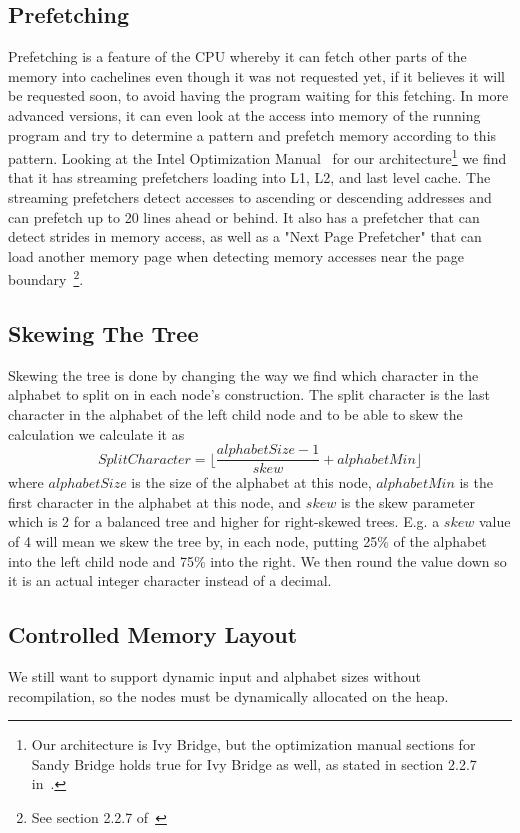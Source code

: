 \subsection{Prefetching}
Prefetching is a feature of the CPU whereby it can fetch other parts of the memory into cachelines even though it was not requested yet, if it believes it will be requested soon, to avoid having the program waiting for this fetching.
In more advanced versions, it can even look at the access into memory of the running program and try to determine a pattern and prefetch memory according to this pattern.
Looking at the Intel Optimization Manual~\cite{intel-optimization-manual} for our architecture\footnote{Our architecture is Ivy Bridge, but the optimization manual sections for Sandy Bridge holds true for Ivy Bridge as well, as stated in section 2.2.7 in~\cite{intel-optimization-manual}.} we find that it has streaming prefetchers loading into L1, L2, and last level cache. The streaming prefetchers detect accesses to ascending or descending addresses and can prefetch up to 20 lines ahead or behind. It also has a prefetcher that can detect strides in memory access, as well as a "Next Page Prefetcher" that can load another memory page when detecting memory accesses near the page boundary~\footnote{See section 2.2.7 of~\cite{intel-optimization-manual}}.


\subsection{Skewing The Tree}
\label{sec:SkewingTheTree}
Skewing the tree is done by changing the way we find which character in the alphabet to split on in each node's construction.
The split character is the last character in the alphabet of the left child node and to be able to skew the calculation we calculate it as
\[SplitCharacter = \lfloor \frac{alphabetSize-1}{skew} + alphabetMin \rfloor \]
where $alphabetSize$ is the size of the alphabet at this node, $alphabetMin$ is the first character in the alphabet at this node, and $skew$ is the skew parameter which is 2 for a balanced tree and higher for right-skewed trees. E.g. a $skew$ value of 4 will mean we skew the tree by, in each node, putting 25\% of the alphabet into the left child node and 75\% into the right.
We then round the value down so it is an actual integer character instead of a decimal.


\subsection{Controlled Memory Layout}
We still want to support dynamic input and alphabet sizes without recompilation, so the nodes must be dynamically allocated on the heap.

